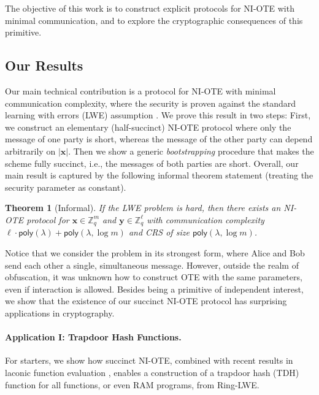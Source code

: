 \documentclass{article}
\newtheorem{theorem}{Theorem}\newtheorem{lemma}[theorem]{Lemma}\newtheorem{proposition}[theorem]{Proposition}\newtheorem{corollary}[theorem]{Corollary}\newtheorem{definition}[theorem]{Definition}\newtheorem{claim}[theorem]{Claim}
\newcommand{\Z}{\mathbb{Z}}
\newcommand{\poly}{\mathsf{poly}}
\renewcommand{\sec}{\ensuremath{\lambda}}
\begin{document}
The objective of this work is to construct explicit protocols for NI-OTE with minimal communication, and to explore the cryptographic consequences of this primitive.

\subsection{Our Results}

Our main technical contribution is a protocol for NI-OTE with minimal communication complexity, where the security is proven against the standard learning with errors (LWE) assumption \cite{STOC:Regev05}.
We prove this result in two steps: First, we construct an elementary (half-succinct) NI-OTE protocol where only the message of one party is short, whereas the message of the other party can depend arbitrarily on $|\mathbf{x}|$. Then we show a generic \emph{bootstrapping} procedure that makes the scheme fully succinct, i.e., the messages of both parties are short.
Overall, our main result is captured by the following informal theorem statement (treating the security parameter as constant).
\begin{theorem}[Informal]
    If the LWE problem is hard, then there exists an NI-OTE protocol for $\mathbf{x}\in\Z_q^m$ and $\mathbf{y}\in\Z_q^\ell$ with communication complexity $\ell\cdot \poly(\sec) + \poly(\sec, \log m)$ and CRS of size $\poly(\sec, \log m)$.
\end{theorem}
%
{Notice that we consider the problem in its strongest form, where Alice and Bob send each other a single, simultaneous message. However, outside the realm of obfuscation, it was unknown how to construct OTE with the same parameters, even if interaction is allowed.}
Besides being a primitive of independent interest, we show that the existence of our succinct NI-OTE protocol has surprising applications in cryptography. 

\paragraph{Application I: Trapdoor Hash Functions.}
For starters, we show how succinct NI-OTE, combined with recent results in laconic function evaluation \cite{FOCS:QuaWeeWic18,FOCS:HsiLinLuo23,C:DHMWW24}, enables a construction of a trapdoor hash (TDH) function \cite{C:DGIMMO19} for all functions, or even RAM programs, from Ring-LWE. 
\end{document}
